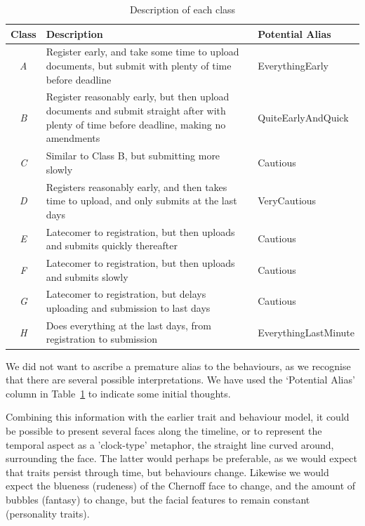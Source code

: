 \documentclass{AISB2008}
\begin{document}
\begin{table}[!ht]
\centering
\begin{tabularx}{\textwidth}{c X l}
\hline
Class & Description & Potential Alias  \\ 
\hline
{\emph{A}} & Register early, and take some time to upload documents, but submit with plenty of time before deadline & EverythingEarly\\
{\emph{B}} & Register reasonably early, but then upload documents and submit straight after with plenty of time before deadline, making no amendments & QuiteEarlyAndQuick\\
{\emph{C}} & Similar to Class B, but submitting more slowly & Cautious\\
{\emph{D}} & Registers reasonably early, and then takes time to upload, and only submits at the last days & VeryCautious\\
{\emph{E}} & Latecomer to registration, but then uploads and submits
quickly thereafter & Cautious\\
{\emph{F}} & Latecomer to registration, but then uploads and submits
slowly & Cautious\\
{\emph{G}} & Latecomer to registration, but delays uploading and
submission to last days & Cautious\\
{\emph{H}} & Does everything at the last days, from registration to submission & EverythingLastMinute\\
\hline
\end{tabularx}
\caption{Description of each class}
\label{tbl:classdesc}
\end{table}

We did not want to ascribe a premature alias to the behaviours, as we
recognise that there are several possible interpretations. We have
used the `Potential Alias' column in Table~\ref{tbl:classdesc} to
indicate some initial thoughts.

Combining this information with the earlier trait and behaviour model,
it could be possible to present several faces along the timeline, or
to represent the temporal aspect as a 'clock-type' metaphor, the
straight line curved around, surrounding the face.  The latter would
perhaps be preferable, as we would expect that traits persist through
time, but behaviours change. Likewise we would expect the blueness
(rudeness) of the Chernoff face to change, and the amount of bubbles
(fantasy) to change, but the facial features to remain constant
(personality traits).
\end{document}
